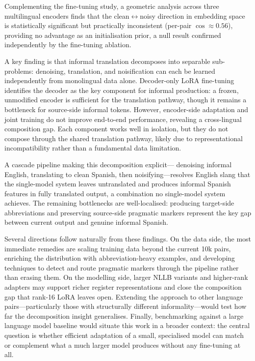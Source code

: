 \documentclass[11pt]{article}
\begin{document}
Complementing the fine-tuning study, a geometric analysis
across three multilingual encoders finds that the
clean$\leftrightarrow$noisy direction in embedding space is
statistically significant but practically inconsistent
(per-pair $\cos \approx 0.56$), providing no advantage as an
initialisation prior, a null result confirmed independently
by the fine-tuning ablation.

A key finding is that informal translation decomposes into
separable sub-problems: denoising, translation, and
noisification can each be learned independently from
monolingual data alone. Decoder-only LoRA fine-tuning identifies the decoder as the
key component for informal production: a frozen, unmodified
encoder is sufficient for the translation pathway, though it
remains a bottleneck for source-side informal tokens. However, 
encoder-side adaptation and joint training do not
improve end-to-end performance, revealing a cross-lingual
composition gap. Each component works well in isolation, but
they do not compose through the shared translation pathway,
likely due to representational incompatibility rather than a
fundamental data limitation.

A cascade pipeline making this decomposition explicit---
denoising informal English, translating to clean Spanish, then
noisifying---resolves English slang that the single-model
system leaves untranslated and produces informal Spanish
features in fully translated output, a combination no
single-model system achieves. The remaining bottlenecks are
well-localised: producing target-side abbreviations and
preserving source-side pragmatic markers represent the key gap
between current output and genuine informal Spanish.

Several directions follow naturally from these findings.
On the data side, the most immediate remedies are scaling
training data beyond the current 10k pairs, enriching the
distribution with abbreviation-heavy examples, and developing
techniques to detect and route pragmatic markers through the
pipeline rather than erasing them. On the modelling side, larger
NLLB variants and higher-rank adapters may support richer
register representations and close the composition gap that
rank-16 LoRA leaves open. Extending the approach to other
language pairs---particularly those with structurally
different informality---would test how far the decomposition insight
generalises. Finally, benchmarking against a large language
model baseline would situate this work in a broader context:
the central question is whether efficient adaptation of a
small, specialised model can match or complement what a much
larger model produces without any fine-tuning at all.
\end{document}
